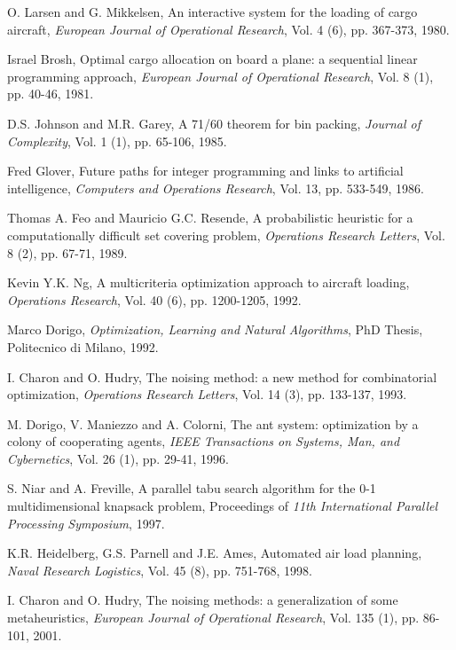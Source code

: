 \documentclass[preprint]{elsarticle}
\begin{document}
\begin{thebibliography}{00}

 O. Larsen and G. Mikkelsen, An interactive system for the loading of cargo aircraft, {\it European Journal of Operational Research}, Vol. 4 (6), pp. 367-373, 1980.

 Israel Brosh, Optimal cargo allocation on board a plane: a sequential linear programming approach, {\it European Journal of Operational Research}, Vol. 8 (1), pp. 40-46, 1981.

 D.S. Johnson and M.R. Garey, A 71/60 theorem for bin packing, {\it Journal of Complexity}, Vol. 1 (1), pp. 65-106, 1985.

 Fred Glover, Future paths for integer programming and links to artificial intelligence, {\it Computers and Operations Research}, Vol. 13, pp. 533-549, 1986.

 Thomas A. Feo and Mauricio G.C. Resende, A probabilistic heuristic for a computationally difficult set covering problem, {\it Operations Research Letters}, Vol. 8 (2), pp. 67-71, 1989.

 Kevin Y.K. Ng, A multicriteria optimization approach to aircraft loading, {\it Operations Research}, Vol. 40 (6), pp. 1200-1205, 1992.

 Marco Dorigo, {\it Optimization, Learning and Natural Algorithms}, PhD Thesis, Politecnico di Milano, 1992.

 I. Charon and O. Hudry, The noising method: a new method for combinatorial optimization, {\it Operations Research Letters}, Vol. 14 (3), pp. 133-137, 1993.

 M. Dorigo, V. Maniezzo and A. Colorni, The ant system: optimization by a colony of cooperating agents, {\it IEEE Transactions on Systems, Man, and Cybernetics}, Vol. 26 (1), pp. 29-41, 1996.

 S. Niar and A. Freville, A parallel tabu search algorithm for the 0-1 multidimensional knapsack problem, Proceedings of {\it 11th International Parallel Processing Symposium}, 1997.

 K.R. Heidelberg, G.S. Parnell and J.E. Ames, Automated air load planning, {\it Naval Research Logistics}, Vol. 45 (8), pp. 751-768, 1998.

 I. Charon and O. Hudry, The noising methods: a generalization of some metaheuristics, {\it European Journal of Operational Research}, Vol. 135 (1), pp. 86-101, 2001.


\end{thebibliography}
\end{document}
